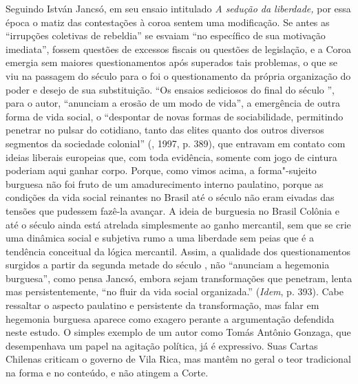 Seguindo István Jancsó, em seu ensaio intitulado \emph{A sedução da
liberdade,} por essa época o matiz das contestações à coroa sentem uma
modificação. Se antes as ``irrupções coletivas de rebeldia'' se esvaiam
``no específico de sua motivação imediata'', fossem questões de excessos
fiscais ou questões de legislação, e a Coroa emergia sem maiores
questionamentos após superados tais problemas, o que se viu na passagem
do século  para o  foi o questionamento da própria organização
do poder e desejo de sua substituição. ``Os ensaios sediciosos do final
do século '', para o autor, ``anunciam a erosão de um modo de
vida'', a emergência de outra forma de vida social, o ``despontar de
novas formas de sociabilidade, permitindo penetrar no pulsar do
cotidiano, tanto das elites quanto dos outros diversos segmentos da
sociedade colonial'' (, 1997, p. 389), que entravam em contato com
ideias liberais europeias que, com toda evidência, somente com jogo de
cintura poderiam aqui ganhar corpo. Porque, como vimos acima, a
forma"-sujeito burguesa não foi fruto de um amadurecimento interno
paulatino, porque as condições da vida social reinantes no Brasil até o
século  não eram eivadas das tensões que pudessem fazê-la avançar. A
ideia de burguesia no Brasil Colônia e até o século  ainda está
atrelada simplesmente ao ganho mercantil, sem que se crie uma dinâmica
social e subjetiva rumo a uma liberdade sem peias que é a tendência
conceitual da lógica mercantil. Assim, a qualidade dos questionamentos
surgidos a partir da segunda metade do século , não ``anunciam a
hegemonia burguesa'', como pensa Jancsó, embora sejam transformações que
penetram, lenta mas persistentemente, ``no fluir da vida social
organizada.'' (\emph{Idem}, p. 393). Cabe ressaltar o aspecto paulatino
e persistente da transformação, mas falar em hegemonia burguesa aparece
como exagero perante a argumentação defendida neste estudo. O simples
exemplo de um autor como Tomás Antônio Gonzaga, que desempenhava um
papel na agitação política, já é expressivo. Suas Cartas Chilenas
criticam o governo de Vila Rica, mas mantêm no geral o teor tradicional
na forma e no conteúdo, e não atingem a Corte.

